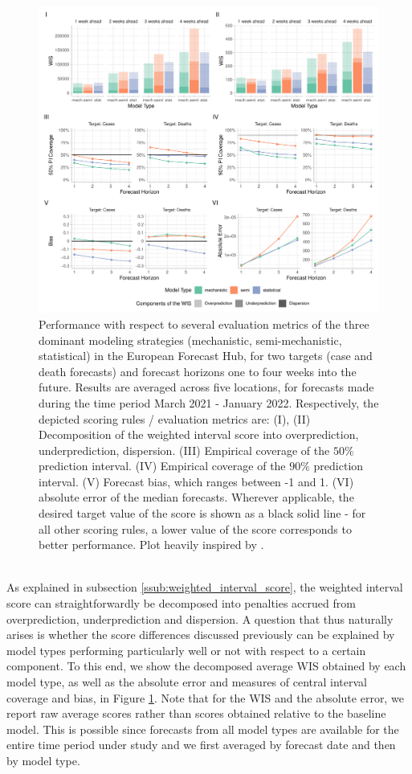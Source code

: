 \begin{figure}
\centering
\includegraphics[width = \textwidth]{../plots/overall_assessment_model_types.pdf}
\caption{Performance with respect to several evaluation metrics of the three dominant modeling strategies (mechanistic, semi-mechanistic, statistical) in the European Forecast Hub, for two targets (case and death forecasts) and forecast horizons one to four weeks into the future. Results are averaged across five locations, for forecasts made during the time period March 2021 - January 2022. Respectively, the depicted scoring rules / evaluation metrics are: (I), (II) Decomposition of the weighted interval score into overprediction, underprediction, dispersion. (III) Empirical coverage of the $50\%$ prediction interval. (IV) Empirical coverage of the $90\%$ prediction interval. (V) Forecast bias, which ranges between -1 and 1. (VI) absolute error of the median forecasts. Wherever applicable, the desired target value of the score is shown as a black solid line - for all other scoring rules, a lower value of the score corresponds to better performance. Plot heavily inspired by \cite{bosse_comparing_2021-1}.}
\label{fig:decomp_model_types}
\end{figure}\medskip\\ 
\noindent As explained in subsection \ref{ssub:weighted_interval_score}, the weighted interval score can straightforwardly be decomposed into penalties accrued from overprediction, underprediction and dispersion. A question that thus naturally arises is whether the score differences discussed previously can be explained by model types performing particularly well or not with respect to a certain component. To this end, we show the decomposed average WIS obtained by each model type, as well as the absolute error and measures of central interval coverage and bias, in Figure \ref{fig:decomp_model_types}. Note that for the WIS and the absolute error, we report raw average scores rather than scores obtained relative to the baseline model. This is possible since forecasts from all model types are available for the entire time period under study and we first averaged by forecast date and then by model type.\\ 
